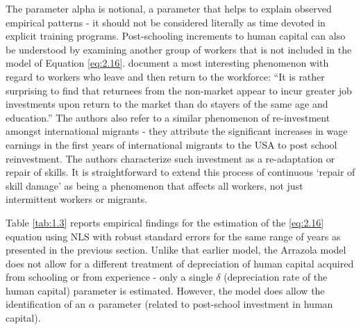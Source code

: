 \documentclass[alpha-refs]{wiley-article-02b}
\begin{document}
The parameter alpha is notional, a parameter that helps to explain 
observed empirical patterns - it should not be considered literally as time 
devoted in explicit training programs. Post-schooling increments to human 
capital can also be understood by examining another group of workers that 
is not included in the model of Equation \ref{eq:2.16}.  \cite{Mincer_1982} 
document a most interesting phenomenon with regard to workers who leave and 
then return to the workforce: ``It is rather surprising to find that 
returnees from the non-market appear to incur greater job investments upon 
return to the market than do stayers of the same age and education.'' The 
authors also refer to a similar phenomenon of re-investment amongst 
international migrants - they attribute the significant increases in wage 
earnings in the first years of international migrants to the USA to post 
school reinvestment. The authors characterize such investment as a 
re-adaptation or repair of skills. It is straightforward to extend this 
process of continuous `repair of skill damage' as being a phenomenon that 
affects all workers, not just intermittent workers or migrants. 


Table \ref{tab:1.3} reports empirical findings for the estimation of the 
\ref{eq:2.16} equation using NLS with robust standard errors for the same 
range of years as presented in the previous section. Unlike that earlier 
model, the Arrazola model does not allow for a different treatment of 
depreciation of human capital acquired from schooling or from experience - 
only a single $\delta$ (depreciation rate of the human capital) parameter 
is estimated. However, the model does allow the identification of an  
$\alpha$ parameter (related to post-school investment in human capital). 

\newpage
\end{document}
